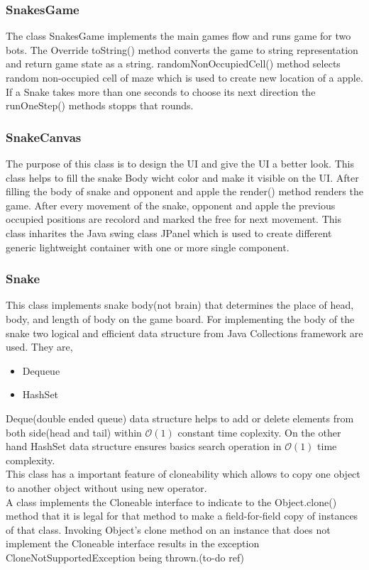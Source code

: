 \documentclass[a4paper,12pt]{article}
\begin{document}
\subsubsection{SnakesGame}
The class SnakesGame implements the main games flow and runs game for two bots. The Override toString() method converts the game to string representation and return game state as a string. randomNonOccupiedCell() method selects random non-occupied cell of maze which is used to create new location of a apple. If a Snake takes more than one seconds to choose its  next direction the runOneStep() methods stopps that rounds.

\subsubsection{SnakeCanvas}
The purpose of this class is to design the UI and give the UI a better look. This class helps to fill the  snake Body wicht color and make it visible on the UI. After filling the body of snake and opponent and apple the render() method renders the game. After every movement of the snake, opponent and apple the previous occupied positions are recolord and marked the free for next movement. This class inharites the Java swing class JPanel which is used to create different generic lightweight container with one or more single component.
\subsubsection{Snake}
This class implements snake body(not brain) that determines the place of head, body, and length of body on the game board. For implementing the body of the snake two logical and efficient data structure from Java Collections framework are used. They are,
\begin{itemize}
\item Dequeue
\item HashSet
\end{itemize}
Deque(double ended queue) data structure helps to add or delete elements from both side(head and tail) within $\mathcal{O}(1)$ constant time coplexity. On the other hand HashSet data structure ensures basics search operation in $\mathcal{O}(1)$ time complexity.\\
This class has a important feature of cloneability which allows to copy one object to another object without using new operator.\\
A class implements the Cloneable interface to indicate to the Object.clone() method that it is legal for that method to make a field-for-field copy of instances of that class.
Invoking Object's clone method on an instance that does not implement the Cloneable interface results in the exception CloneNotSupportedException being thrown.(to-do ref)
\end{document}
